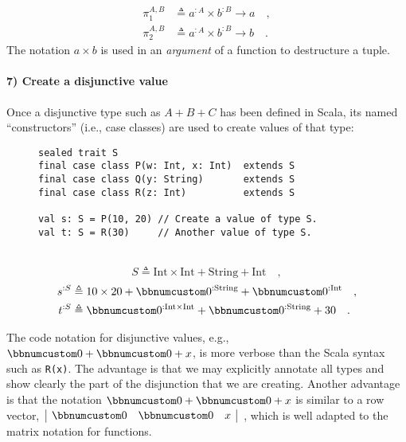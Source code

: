 ~\vspace{-1\baselineskip}
\begin{align*}
\pi_{1}^{A,B} & \triangleq a^{:A}\times b^{:B}\rightarrow a\quad,\\
\pi_{2}^{A,B} & \triangleq a^{:A}\times b^{:B}\rightarrow b\quad.
\end{align*}
The notation $a\times b$ is used in an \emph{argument} of a function
to destructure a tuple.

\paragraph{7) Create a disjunctive value}

Once a disjunctive type such as $A+B+C$ has been defined in Scala,
its named \textsf{``}constructors\textsf{''} (i.e., case classes) are used to create
values of that type:

\begin{wrapfigure}{l}{0.5\columnwidth}%
\vspace{-0.75\baselineskip}
\begin{lstlisting}
sealed trait S
final case class P(w: Int, x: Int)  extends S
final case class Q(y: String)       extends S
final case class R(z: Int)          extends S

val s: S = P(10, 20) // Create a value of type S.
val t: S = R(30)     // Another value of type S.
\end{lstlisting}

\vspace{-0\baselineskip}
\end{wrapfigure}%

~\vspace{0.35\baselineskip}
\[
S\triangleq\text{Int}\times\text{Int}+\text{String}+\text{Int}\quad,
\]
\begin{align*}
s^{:S} & \triangleq10\times20+\bbnum 0^{:\text{String}}+\bbnum 0^{:\text{Int}}\quad,\\
t^{:S} & \triangleq\bbnum 0^{:\text{Int}\times\text{Int}}+\bbnum 0^{:\text{String}}+30\quad.
\end{align*}
\vspace{-0.9\baselineskip}

The code notation for disjunctive values, e.g., $\bbnum 0+\bbnum 0+x$,
is more verbose than the Scala syntax such as \lstinline!R(x)!. The
advantage is that we may explicitly annotate all types and show clearly
the part of the disjunction that we are creating. Another advantage
is that the notation $\bbnum 0+\bbnum 0+x$ is similar to a row vector,
$\,\begin{array}{|ccc|}
\bbnum 0 & \bbnum 0 & x\end{array}$~, which is well adapted to the matrix notation for functions.

